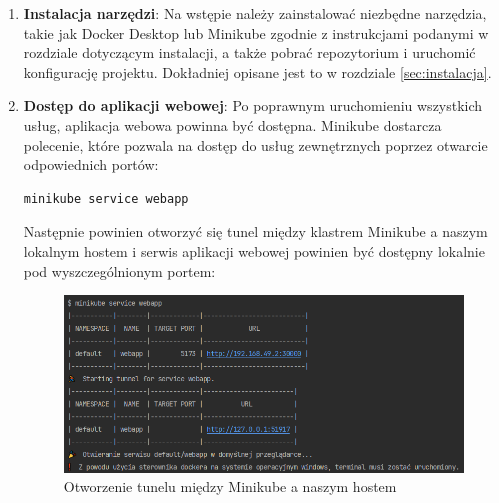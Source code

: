 \documentclass[polish]{aghengthesis}
\begin{document}
\begin{enumerate}
    \item \textbf{Instalacja narzędzi}:
    Na wstępie należy zainstalować niezbędne narzędzia, takie jak Docker Desktop lub Minikube zgodnie z instrukcjami podanymi w rozdziale dotyczącym instalacji, a także pobrać repozytorium i uruchomić konfigurację projektu. Dokładniej opisane jest to w rozdziale \ref{sec:instalacja}.

    \item \textbf{Dostęp do aplikacji webowej}:
    Po poprawnym uruchomieniu wszystkich usług, aplikacja webowa powinna być dostępna. Minikube dostarcza polecenie, które pozwala na dostęp do usług zewnętrznych poprzez otwarcie odpowiednich portów:
\begin{lstlisting}[basicstyle=\ttfamily, numbers=none]
minikube service webapp\end{lstlisting}\vspace{-20pt}
Następnie powinien otworzyć się tunel między klastrem Minikube a naszym lokalnym hostem i serwis aplikacji webowej powinien być dostępny lokalnie pod wyszczególnionym portem:
\begin{figure}[!htbp]
    \centering
    \includegraphics[width=0.9\linewidth]{resources/webapp expose.PNG}
    \caption{Otworzenie tunelu między Minikube a naszym hostem}
    \label{fig:tunel}
\end{figure}
\newpage


\end{enumerate}
\end{document}
